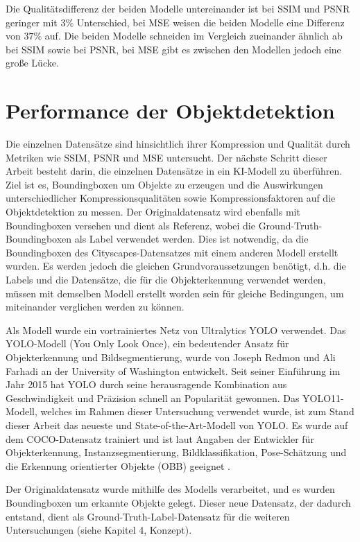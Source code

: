             Die Qualitätsdifferenz der beiden Modelle untereinander ist bei SSIM und PSNR geringer mit $3\%$ Unterschied, bei MSE weisen die beiden Modelle eine Differenz von $37\%$ auf.
            Die beiden Modelle schneiden im Vergleich zueinander ähnlich ab bei SSIM sowie bei PSNR, bei MSE 
            gibt es zwischen den Modellen jedoch eine große Lücke.
            
\newpage
    \section{Performance der Objektdetektion}
        Die einzelnen Datensätze sind hinsichtlich ihrer Kompression und Qualität durch Metriken wie SSIM, PSNR und MSE untersucht. Der nächste Schritt dieser Arbeit besteht darin, die einzelnen Datensätze in ein KI-Modell zu überführen. \\
        Ziel ist es, Boundingboxen um Objekte zu erzeugen und die Auswirkungen unterschiedlicher Kompressionsqualitäten sowie Kompressionsfaktoren auf die Objektdetektion zu messen. Der Originaldatensatz wird ebenfalls mit Boundingboxen versehen und dient als Referenz, wobei die Ground-Truth-Boundingboxen als Label verwendet werden.
        Dies ist notwendig, da die Boundingboxen des Cityscapes-Datensatzes mit einem anderen Modell erstellt wurden. Es werden jedoch die gleichen Grundvoraussetzungen benötigt, d.h. die Labels und die Datensätze, die für die Objekterkennung verwendet werden, müssen mit demselben Modell erstellt worden sein für gleiche Bedingungen, um miteinander verglichen werden zu können.
    
        Als Modell wurde ein vortrainiertes Netz von Ultralytics YOLO verwendet. Das YOLO-Modell (You Only Look Once), ein bedeutender Ansatz für Objekterkennung und Bildsegmentierung, wurde von Joseph Redmon und Ali Farhadi an der University of Washington entwickelt. Seit seiner Einführung im Jahr 2015 hat YOLO durch seine herausragende Kombination aus Geschwindigkeit und Präzision schnell an Popularität gewonnen.
        Das YOLO11-Modell, welches im Rahmen dieser Untersuchung verwendet wurde, ist zum Stand dieser Arbeit das neueste und State-of-the-Art-Modell von YOLO. Es wurde auf dem COCO-Datensatz trainiert und ist laut Angaben der Entwickler für Objekterkennung, Instanzsegmentierung, Bildklassifikation, Pose-Schätzung und die Erkennung orientierter Objekte (OBB) geeignet \cite{yolo_modell}.

        Der Originaldatensatz wurde mithilfe des Modells verarbeitet, und es wurden Boundingboxen um erkannte Objekte gelegt. Dieser neue Datensatz, der dadurch entstand, dient als Ground-Truth-Label-Datensatz für die weiteren Untersuchungen (siehe Kapitel 4, Konzept).

